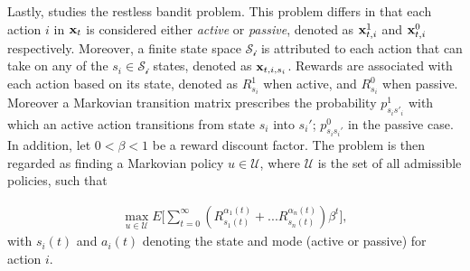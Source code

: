Lastly, \citep{alon} studies the restless bandit problem. This problem differs in that each action $i$ in ${\bf x}_{t}$ is considered either \textit{active} or \textit{passive}, denoted as ${\bf x}_{t,i}^1$ and ${\bf x}_{t,i}^0$ respectively. Moreover, a finite state space $\mathcal{S_i}$ is attributed to each action that can take on any of the $s_i\in \mathcal{S_i}$ states, denoted as ${\bf x}_{t, i, s_i}$. Rewards are associated with each action based on its state, denoted as $R_{s_i}^1$ when active, and $R_{s_i}^0$ when passive. Moreover a Markovian transition matrix prescribes the probability $p^1_{s_is'_i}$ with which an active action transitions from state $s_i$ into $s_i'$; $p^0_{s_is_i'}$ in the passive case. In addition, let $0<\beta<1$ be a reward discount factor. The problem is then regarded as finding a Markovian policy $u\in \mathcal{U}$, where $\mathcal{U}$ is the set of all admissible policies, such that 

\begin{align}
	\max_{u\in\mathcal{U}}E\bigg[\sum_{t=0}^\infty(R_{s_1(t)}^{\alpha_1(t)}+...R_{s_n(t)}^{\alpha_n(t)})\beta^t\bigg],
\end{align}
with $s_i(t)$ and $a_i(t)$ denoting the state and mode (active or passive) for action $i$.